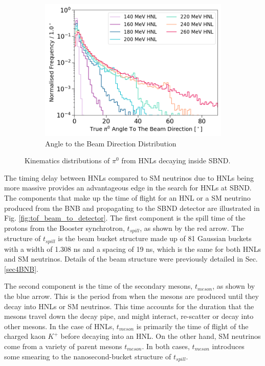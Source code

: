 \begin{figure}[t!]
\begin{subfigure}[b]{0.495\textwidth}
            \includegraphics[width=\textwidth]{pi0_angle2Beam}
            \caption{Angle to the Beam Direction Distribution}%
        \end{subfigure}
        \caption[Kinematics Distributions of Neutral Pions From HNLs]{Kinematics distributions of $\pi^0$ from HNLs decaying inside SBND.}
        \label{fig:pi0_distribution}
\end{figure}

The timing delay between HNLs compared to SM neutrinos due to HNLs being more massive provides an advantageous edge in the search for HNLs at SBND. 
The components that make up the time of flight for an HNL or a SM neutrino produced from the BNB and propagating to the SBND detector are illustrated in Fig. \ref{fig:tof_beam_to_detector}.
The first component is the spill time of the protons from the Booster synchrotron, $t_{spill}$, as shown by the red arrow.
The structure of $t_{spill}$ is the beam bucket structure made up of 81 Gaussian buckets with a width of 1.308 ns and a spacing of 19 ns, which is the same for both HNLs and SM neutrinos.
Details of the beam structure were previously detailed in Sec. \ref{sec4BNB}.   

The second component is the time of the secondary mesons, $t_{meson}$, as shown by the blue arrow.
This is the period from when the mesons are produced until they decay into HNLs or SM neutrinos.
This time accounts for the duration that the mesons travel down the decay pipe, and might interact, re-scatter or decay into other mesons.
In the case of HNLs, $t_{meson}$ is primarily the time of flight of the charged kaon $K^+$ before decaying into an HNL.
On the other hand, SM neutrinos come from a variety of parent mesons $t_{meson}$. %
In both cases, $t_{meson}$ introduces some smearing to the nanosecond-bucket structure of $t_{spill}$.

